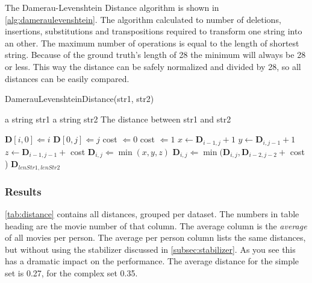 The Damerau-Levenshtein Distance algorithm is shown in \autoref{alg:dameraulevenshtein}. The algorithm calculated to number of deletions, insertions, substitutions and transpositions required to transform one string into an other. The maximum number of operations is equal to the length of shortest string. Because of the ground truth's length of 28 the minimum will always be 28 or less. This way the distance can be safely normalized and divided by 28, so all distances can be easily compared.

\begin{algorithm}
\caption{DamerauLevenshteinDistance(str1, str2)}
\label{alg:dameraulevenshtein}
\begin{algorithmic}
   \REQUIRE a string str1
   \REQUIRE a string str2
   \ENSURE The distance between str1 and str2

   \medskip

       \STATE $\mathbf{D}[i, 0] \Leftarrow i$
   \ENDFOR
       \STATE $\mathbf{D}[0, j] \Leftarrow j$
   \ENDFOR
				\STATE cost $\Leftarrow 0$
            \ELSE
				\STATE cost $\Leftarrow 1$
			\ENDIF
			\STATE $x \leftarrow \mathbf{D}_{i-1, j  } + 1$ %
			\STATE $y \leftarrow \mathbf{D}_{i  , j-1} + 1$ %
            \STATE $z \leftarrow \mathbf{D}_{i-1, j-1} + $ cost %
            \STATE $\mathbf{D}_{i, j} \Leftarrow \min(x, y, z)$
				\STATE $\mathbf{D}_{i, j} \Leftarrow \min(
                	\mathbf{D}_{i, j},
                    \mathbf{D}_{i-2, j-2} + $ cost  %
                )
			\ENDIF
		\ENDFOR
	\ENDFOR
   \RETURN $\mathbf{D}_{lenStr1, lenStr2}$

\end{algorithmic}
\end{algorithm}
	
\subsubsection{Results}
\autoref{tab:distance} contains all distances, grouped per dataset. The numbers in table heading are the movie number of that column. The average column is the \textit{average} of all movies per person. The average per person column lists the same distances, but without using the stabilizer discussed in \autoref{subsec:stabilizer}. As you see this has a dramatic impact on the performance. The average distance for the simple set is 0.27, for the complex set 0.35.

